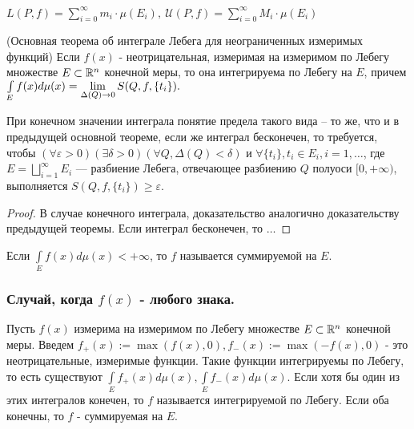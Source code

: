 $L(P, f)=\sum\limits_{i=0}^{\infty}m_i\cdot \mu(E_i),\  \mathcal{U}(P, f)=\sum\limits_{i=0}^{\infty}M_i\cdot \mu(E_i)$ 

\begin{theorem}(Основная теорема об интеграле Лебега для неограниченных измеримых функций)
Если $f(x)$ - неотрицательная, измеримая на измеримом по Лебегу множестве $E\subset \R^n$ конечной меры, то она интегрируема по Лебегу на $E$, причем
$\int\limits_E f(x)d\mu(x)\?=\lim\limits_{\Delta(Q)\to0}S(Q, f, \{t_i\}).$ 

При конечном значении интеграла понятие предела такого вида -- то же, что и в предыдущей основной теореме, если же интеграл бесконечен, то требуется, чтобы \newline$(\forall \varepsilon>0) (\exists \delta > 0)(\forall Q, \Delta(Q)<\delta) \text{ и } \forall \{t_i\}, t_i \in E_i, i=1,\ldots$, где $E=\bigsqcup\limits_{i=1}^{\infty} E_i$ --- разбиение Лебега, отвечающее разбиению $Q$ полуоси $[0, +\infty)$, выполняется $S(Q, f, \{t_i\})\geqslant\varepsilon$.
\end{theorem}

\begin{proof}
В случае конечного интеграла, доказательство аналогично доказательству предыдущей теоремы. Если интеграл бесконечен, то $\ldots$
\end{proof}

\begin{Def}
Если $\int\limits_E f(x)d\mu(x) < +\infty$, то $f$ называется суммируемой на $E$.
\end{Def}

\subsubsection{Случай, когда $f(x)$ - любого знака.}
Пусть $f(x)$ измерима на измеримом по Лебегу множестве $E \subset \R^n$ конечной меры. Введем $f_+(x):=\max(f(x), 0), f_-(x):=\max(-f(x), 0)$ - это неотрицательные, измеримые функции. Такие функции интегрируемы по Лебегу, то есть существуют $\int\limits_E f_+(x)d\mu(x), \int\limits_E f_-(x)d\mu(x)$. Если хотя бы один из этих интегралов конечен, то $f$ называется интегрируемой по Лебегу. Если оба конечны, то $f$ - суммируемая на $E$.



